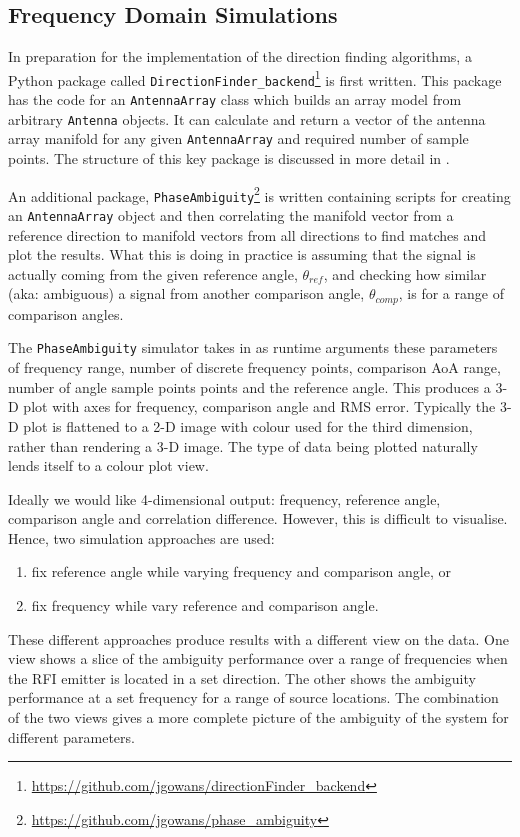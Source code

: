\subsection{Frequency Domain Simulations}
In preparation for the implementation of the direction finding algorithms, a Python package called \lstinline{DirectionFinder_backend}\footnote{\url{https://github.com/jgowans/directionFinder\_backend}} is first written. This package has the code for an \lstinline{AntennaArray} class which builds an array model from arbitrary \lstinline{Antenna} objects. It can calculate and return a vector of the antenna array manifold for any given \lstinline{AntennaArray} and required number of sample points. The structure of this key package is discussed in more detail in .

An additional package, \lstinline{PhaseAmbiguity}\footnote{\url{https://github.com/jgowans/phase\_ambiguity}} is written containing scripts for creating an \lstinline{AntennaArray} object and then correlating the manifold vector from a reference direction to manifold vectors from all directions to find matches and plot the results. What this is doing in practice is assuming that the signal is actually coming from the given reference angle, \(\theta_{ref}\), and checking how similar (aka: ambiguous) a signal from another comparison angle, \(\theta_{comp}\), is for a range of comparison angles.

The \lstinline{PhaseAmbiguity} simulator takes in as runtime arguments these parameters of frequency range, number of discrete frequency points, comparison AoA range, number of angle sample points points and the reference angle.
This produces a 3-D plot with axes for frequency, comparison angle and RMS error. Typically the 3-D plot is flattened to a 2-D image with colour used for the third dimension, rather than rendering a 3-D image. The type of data being plotted naturally lends itself to a colour plot view.

Ideally we would like 4-dimensional output: frequency, reference angle, comparison angle and correlation difference. However, this is difficult to visualise. Hence, two simulation approaches are used:
\begin{enumerate}
  \item fix reference angle while varying frequency and comparison angle, or
  \item fix frequency while vary reference and comparison angle.
\end{enumerate}
These different approaches produce results with a different view on the data. One view shows a slice of the ambiguity performance over a range of frequencies when the RFI emitter is located in a set direction. The other shows the ambiguity performance at a set frequency for a range of source locations. The combination of the two views gives a more complete picture of the ambiguity of the system for different parameters.

